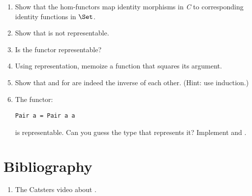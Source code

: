 \begin{enumerate}
\tightlist
\item
  Show that the hom-functors map identity morphisms in \emph{C} to
  corresponding identity functions in $\Set$.
\item
  Show that  is not representable.
\item
  Is the  functor representable?
\item
  Using  representation, memoize a function that squares
  its argument.
\item
  Show that  and  for  are
  indeed the inverse of each other. (Hint: use induction.)
\item
  The functor:

\begin{Verbatim}
Pair a = Pair a a
\end{Verbatim}
  is representable. Can you guess the type that represents it? Implement
   and .
\end{enumerate}

\section{Bibliography}

\begin{enumerate}
\tightlist
\item
  The Catsters video about
  .
\end{enumerate}
